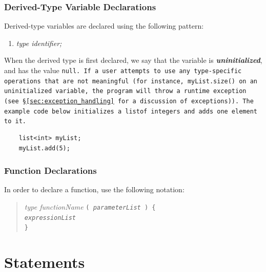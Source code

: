 \documentclass{book}
\begin{document}

\subsubsection{Derived-Type Variable Declarations} %
\label{ssub:derived_type_variable_declarations}

Derived-type variables are declared using the following pattern:

\begin{enumerate}
  \item \emph{type identifier;}
\end{enumerate}

When the derived type is first declared, we say that the variable is
\textbf{\emph{uninitialized}}, and has the value \tt null\rm. If a user
attempts to use any type-­specific operations that are not meaningful (for
instance, \tt myList.size() \rm on an uninitialized variable, the program will
throw a run­time exception (see \S \ref{sec:exception_handling} for a
discussion of exceptions)). The example code below initializes a \tt list\rm of
integers and adds one element to it.

\begin{verbatim}
    list<int> myList;
    myList.add(5);
\end{verbatim}


\subsubsection{Function Declarations} %
\label{ssub:function_declarations}

In order to declare a function, use the following notation:

\begin{quotation}
\emph{type functionName} \tt ( \rm \emph{parameterList} \tt ) \{ \rm \\
\indent \indent \emph{expressionList} \\
\indent \tt \}
\end{quotation}





\section{Statements} %
\label{sec:statements}
\end{document}
